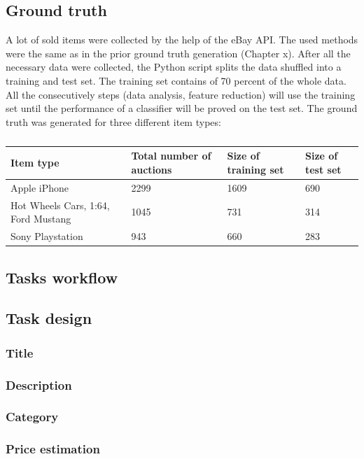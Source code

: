 \subsection{Ground truth}
A lot of sold items were collected by the help of the eBay API. The used methods were the same as in the prior ground truth generation (Chapter x). After all the necessary data were collected, the Python script splits the data shuffled into a training and test set. The training set contains of 70 percent of the whole data. All the consecutively steps (data analysis, feature reduction) will use the training set until the performance of a classifier will be proved on the test set. The ground truth was generated for three different item types:
\begin{table}[h!]
	\begin{center}
	\begin{tabular}{| p{5cm} | l | l | l |}
		\hline
		Item type & Total number of auctions & Size of training set & Size of test set \\
		\hline
		Apple iPhone & 2299 & 1609 & 690 \\
		\hline
		Hot Wheels Cars, 1:64, Ford Mustang & 1045 & 731 & 314 \\
		\hline
		Sony Playstation & 943 & 660 & 283 \\
		\hline
	\end{tabular}
	\end{center}
	\caption{}
\end{table}
\subsection{Tasks workflow}
\subsection{Task design}
\subsubsection{Title}
\subsubsection{Description}
\subsubsection{Category}
\subsubsection{Price estimation}
